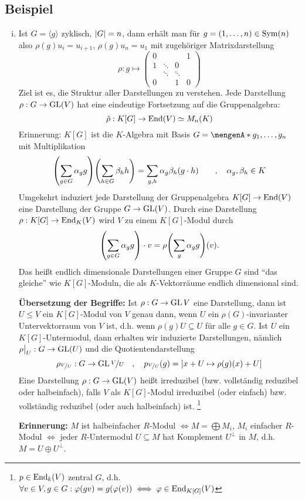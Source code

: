 \subsection{Beispiel} %
\label{sub:42}
\begin{enumerate}[(i)]
	\item Ist $G= \langle g \rangle$ zyklisch, $\abs*{G}=n$, dann erhält man für $g=(1, \ldots ,n) \in \Sym(n)$ also $\rho(g)u_i = u_{i+1}$, $\rho(g)u_n= u_1$ mit
	zugehöriger Matrixdarstellung 
	\[
		\rho : g \longmapsto \begin{pmatrix}
			0 & & & 1 \\
			1 & \ddots & 0 & \\
			 & \ddots & \ddots &\\
			 0 & & 1 & 0
		\end{pmatrix}
	\]
	Ziel ist es, die Struktur aller Darstellungen zu verstehen. Jede Darstellung $\rho : G \to \GL(V)$ hat eine eindeutige Fortsetzung auf die Gruppenalgebra:
	\[
		\tilde{\rho} : K[G] \to \End(V) \simeq M_n(K)
	\]
	Erinnerung: $K[G]$ ist die $K$-Algebra mit Basis $G = \set{g_1, \ldots, g_n}$ mit Multiplikation 
	\[
		\enbrace*{\sum_{g \in G} \alpha_g g} \enbrace*{\sum_{h \in G} \beta_h h} = \sum_{g,h} \alpha_g \beta_h (g \cdot h) \qquad, \quad \alpha_g, \beta_h \in K
	\]
	Umgekehrt induziert jede Darstellung der Gruppenalgebra $K[G] \to \End(V)$ eine Darstellung der Gruppe $G \to \GL(V)$. Durch eine
	Darstellung $\rho : K[G] \to \End_K(V)$ wird $V$ zu einem $K[G]$-Modul durch 
	\[
		\enbrace*{\sum_{g \in G} \alpha_g g} \cdot v= \rho \enbrace*{\sum_g \alpha_g g}(v).
	\]
	Das heißt endlich dimensionale Darstellungen einer Gruppe $G$ sind \enquote{das gleiche} wie $K[G]$-Moduln, die als $K$-Vektorräume endlich dimensional sind.
	
	
	\textbf{Übersetzung der Begriffe:} Ist $\rho : G \to \GL{V}$ eine Darstellung, dann ist $U \le V$ ein $K[G]$-Modul von $V$ genau dann, wenn $U$ ein $\rho(G)$-invarianter
	Untervektorraum von $V$ ist, d.h. wenn $\rho(g)U \subseteq U$ für alle $g \in G$. Ist $U$ ein $K[G]$-Untermodul, dann erhalten wir induzierte Darstellungen, nämlich 
	$\rho\big|_{U} : G \to \GL(U)$ und die Quotientendarstellung 
	\[
		\rho_{\nicefrac{V}{U}} : G \to \GL{\nicefrac{V}{U}} \quad ,\quad p_{\nicefrac{V}{U}} (g) = \benbrace*{x+ U \mapsto \rho(g)(x)+U}
	\]
	Eine Darstellung $\rho : G \to \GL(V)$ heißt irreduzibel (bzw. vollständig reduzibel oder halbeinfach), falls $V$ als $K[G]$-Modul irreduzibel (oder einfach) bzw.
	vollständig reduzibel (oder auch halbeinfach) ist. \footnote{$p \in \End_k(V)$ zentral $G$, d.h. $\forall v \in V, g \in G : \varphi(g v)= g (\varphi(v)) \iff \varphi 
	\in \End_{K[G]}(V)$}
	
	\textbf{Erinnerung:} $M$ ist halbeinfacher $R$-Modul $\iff M= \bigoplus M_i$, $M_i$ einfacher $R$-Modul $\iff$ jeder $R$-Untermodul $U \subseteq M$ hat Komplement
	$U^\bot$ in $M$, d.h. $M= U \oplus U^\bot$.
\end{enumerate}

